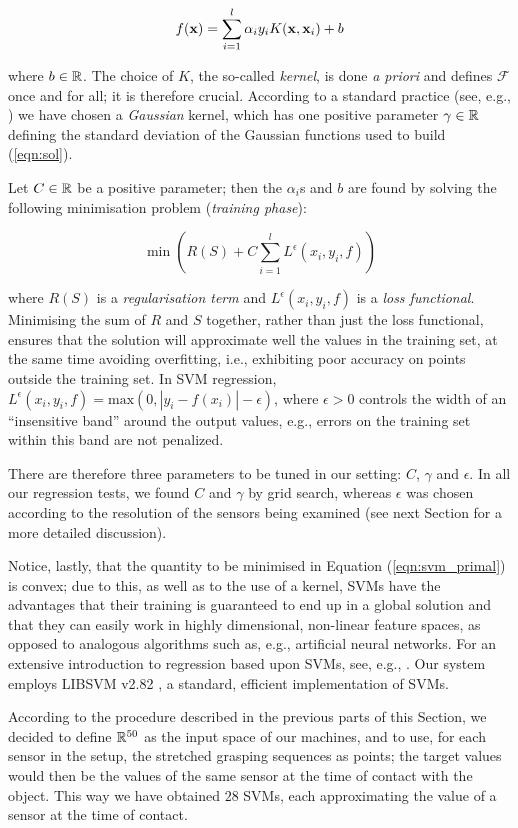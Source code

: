 \begin{equation} \label{eqn:sol}
  f(\mathbf{x}) = \sum_{i=1}^l \alpha_i y_i K(\mathbf{x},\mathbf{x}_i) + b
\end{equation}

\noindent where $b \in \mathbb{R}$. The choice of $K$, the so-called
\emph{kernel}, is done \emph{a priori} and defines $\mathcal{F}$ once and for
all; it is therefore crucial. According to a standard practice (see,
e.g., \cite{Cristianini00}) we have chosen a \emph{Gaussian} kernel,
which has one positive parameter $\gamma \in \mathbb{R}$ defining the
standard deviation of the Gaussian functions used to build
(\ref{eqn:sol}).

Let $C \in \mathbb{R}$ be a positive parameter; then the $\alpha_i$s and $b$
are found by solving the following minimisation problem
(\emph{training phase}):

\begin{equation} \label{eqn:svm_primal}
  \min \left( R(S) + C \sum_{i=1}^l L^\epsilon (x_i,y_i,f) \right)
\end{equation}

\noindent where $R(S)$ is a \emph{regularisation term} and
$L^\epsilon (x_i,y_i,f)$ is a \emph{loss functional}. Minimising the
sum of $R$ and $S$ together, rather than just the loss functional,
ensures that the solution will approximate well the values in the
training set, at the same time avoiding overfitting, i.e., exhibiting
poor accuracy on points outside the training set. In SVM regression,
$L^\epsilon (x_i,y_i,f) = \mbox{max}(0,|y_i-f(x_i)|-\epsilon)$,
where $\epsilon > 0$ controls the width of an ``insensitive band'' around
the output values, e.g., errors on the training set within this band
are not penalized.

There are therefore three parameters to be tuned in our setting:
$C$, $\gamma$ and $\epsilon$. In all our regression tests, we found
$C$ and $\gamma$ by grid search, whereas $\epsilon$ was chosen
according to the resolution of the sensors being examined (see next
Section for a more detailed discussion).

Notice, lastly, that the quantity to be minimised in Equation
(\ref{eqn:svm_primal}) is convex; due to this, as well as to the use
of a kernel, SVMs have the advantages that their training is
guaranteed to end up in a global solution and that they can easily
work in highly dimensional, non-linear feature spaces, as opposed to
analogous algorithms such as, e.g., artificial neural networks. For an
extensive introduction to regression based upon SVMs, see, e.g.,
\cite{SmolaTut2004}. Our system employs LIBSVM v2.82 \cite{ChangL01},
a standard, efficient implementation of SVMs.

According to the procedure described in the previous parts of this
Section, we decided to define $\mathbb{R}^{50}$ as the input space of our
machines, and to use, for each sensor in the setup, the stretched
grasping sequences as points; the target values would then be the
values of the same sensor at the time of contact with the object. This
way we have obtained $28$ SVMs, each approximating the value of a
sensor at the time of contact.
